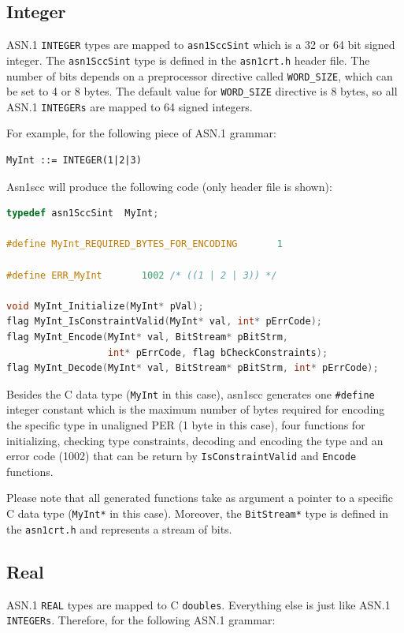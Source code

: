 \documentclass[11pt]{book}
\begin{document}
      \subsection{Integer}
      ASN.1 \texttt{INTEGER} types are mapped to \texttt{asn1SccSint} which is a 32 or 64 bit signed integer. 
      The \texttt{asn1SccSint} type is defined in the \texttt{asn1crt.h} header file. 
      The number of bits depends on a preprocessor directive called \texttt{WORD\_SIZE}, which can be set to 4 or 8 bytes. 
      The default value for \texttt{WORD\_SIZE} directive is 8 bytes, so all ASN.1 \texttt{INTEGERs} are mapped to 64 signed integers.

      For example, for the following piece of ASN.1 grammar:

\begin{lstlisting}
MyInt ::= INTEGER(1|2|3)
\end{lstlisting}

      Asn1scc will produce the following code (only header file is shown):

\begin{lstlisting}[language=c]
typedef asn1SccSint  MyInt;

#define MyInt_REQUIRED_BYTES_FOR_ENCODING		1

#define ERR_MyInt		1002 /* ((1 | 2 | 3)) */

void MyInt_Initialize(MyInt* pVal);
flag MyInt_IsConstraintValid(MyInt* val, int* pErrCode);
flag MyInt_Encode(MyInt* val, BitStream* pBitStrm, 
                  int* pErrCode, flag bCheckConstraints);
flag MyInt_Decode(MyInt* val, BitStream* pBitStrm, int* pErrCode);
\end{lstlisting}
  
      Besides the C data type (\texttt{MyInt} in this case), asn1scc generates one \texttt{\#define}
      integer constant which is the maximum number of bytes required for encoding the 
      specific type in unaligned PER (1 byte in this case), four functions for initializing, 
      checking type constraints, decoding and encoding the type and an error code (1002) 
      that can be return by \texttt{IsConstraintValid} and \texttt{Encode} functions.

      Please note that all generated functions take as argument a pointer to a specific 
      C data type (\texttt{MyInt*} in this case). Moreover, the \texttt{BitStream*} type is defined in the 
      \texttt{asn1crt.h} and represents a stream of bits.

      \subsection{Real}
      ASN.1 \texttt{REAL} types are mapped to C \texttt{doubles}. Everything else is just 
      like ASN.1 \texttt{INTEGERs}. Therefore, for the following ASN.1 grammar:
\end{document}
